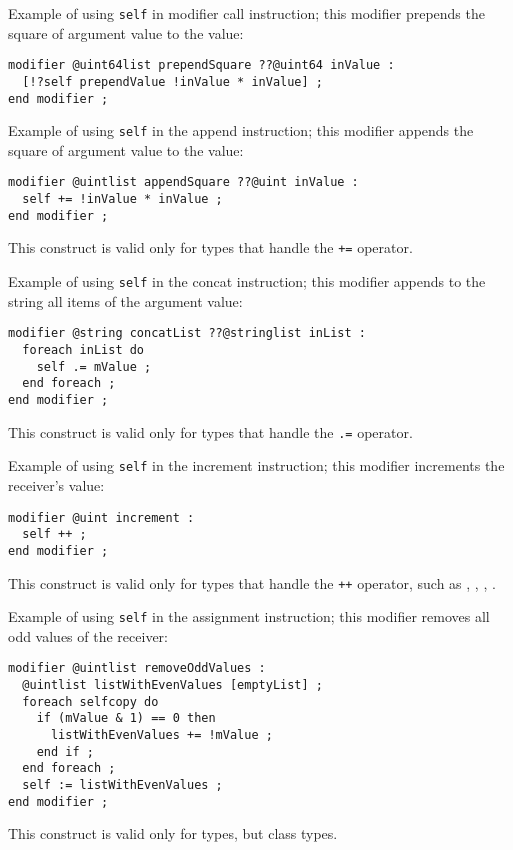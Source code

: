 Example of using \lstinline[language=galgas]!self! in modifier call instruction; this modifier prepends the square of argument value to the  value:
\begin{lstlisting}[language=galgas]
modifier @uint64list prependSquare ??@uint64 inValue :
  [!?self prependValue !inValue * inValue] ;
end modifier ;
\end{lstlisting}


Example of using \lstinline[language=galgas]!self! in the append instruction; this modifier appends the square of argument value to the  value:
\begin{lstlisting}[language=galgas]
modifier @uintlist appendSquare ??@uint inValue :
  self += !inValue * inValue ;
end modifier ;
\end{lstlisting}
This construct is valid only for types that handle the \lstinline[language=galgas]!+=! operator.


Example of using \lstinline[language=galgas]!self! in the concat instruction; this modifier appends to the string all items of the  argument value:
\begin{lstlisting}[language=galgas]
modifier @string concatList ??@stringlist inList :
  foreach inList do
    self .= mValue ;
  end foreach ;
end modifier ;
\end{lstlisting}
This construct is valid only for types that handle the \lstinline[language=galgas]!.=! operator.




Example of using \lstinline[language=galgas]!self! in the increment instruction; this modifier increments the receiver's value:
\begin{lstlisting}[language=galgas]
modifier @uint increment :
  self ++ ;
end modifier ;
\end{lstlisting}
This construct is valid only for types that handle the \lstinline[language=galgas]!++! operator, such as , , , .





Example of using \lstinline[language=galgas]!self! in the assignment instruction; this modifier removes all odd values of the receiver:
\begin{lstlisting}[language=galgas]
modifier @uintlist removeOddValues :
  @uintlist listWithEvenValues [emptyList] ;
  foreach selfcopy do
    if (mValue & 1) == 0 then
      listWithEvenValues += !mValue ;
    end if ;
  end foreach ;
  self := listWithEvenValues ;
end modifier ;
\end{lstlisting}
This construct is valid only for types, but class types.











